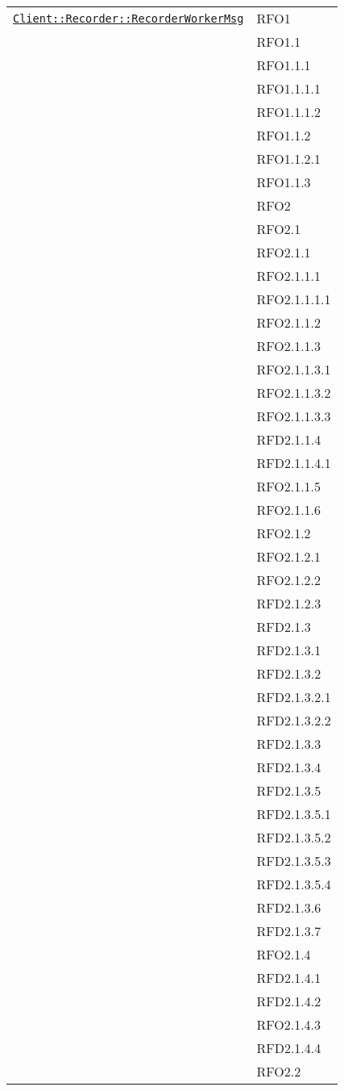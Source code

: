 \begin{longtable}{|>{\centering}m{10cm}|m{3cm}<{\centering}|}
\hyperref[Client::Recorder::RecorderWorkerMsg]{\texttt{Client::Recorder::RecorderWorkerMsg}} & RFO1\\
& RFO1.1\\
& RFO1.1.1\\
& RFO1.1.1.1\\
& RFO1.1.1.2\\
& RFO1.1.2\\
& RFO1.1.2.1\\
& RFO1.1.3\\
& RFO2\\
& RFO2.1\\
& RFO2.1.1\\
& RFO2.1.1.1\\
& RFO2.1.1.1.1\\
& RFO2.1.1.2\\
& RFO2.1.1.3\\
& RFO2.1.1.3.1\\
& RFO2.1.1.3.2\\
& RFO2.1.1.3.3\\
& RFD2.1.1.4\\
& RFD2.1.1.4.1\\
& RFO2.1.1.5\\
& RFO2.1.1.6\\
& RFO2.1.2\\
& RFO2.1.2.1\\
& RFO2.1.2.2\\
& RFD2.1.2.3\\
& RFD2.1.3\\
& RFD2.1.3.1\\
& RFD2.1.3.2\\
& RFD2.1.3.2.1\\
& RFD2.1.3.2.2\\
& RFD2.1.3.3\\
& RFD2.1.3.4\\
& RFD2.1.3.5\\
& RFD2.1.3.5.1\\
& RFD2.1.3.5.2\\
& RFD2.1.3.5.3\\
& RFD2.1.3.5.4\\
& RFD2.1.3.6\\
& RFD2.1.3.7\\
& RFO2.1.4\\
& RFD2.1.4.1\\
& RFD2.1.4.2\\
& RFO2.1.4.3\\
& RFD2.1.4.4\\
& RFO2.2\\

\end{longtable}
